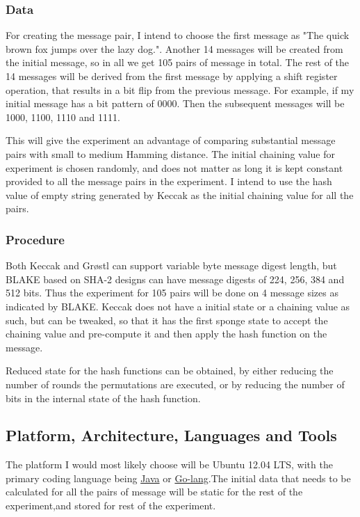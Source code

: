 \documentclass[12pt]{artikel3}                  %
\begin{document}
  \subsubsection{Data}
  
  For creating the message pair, I intend to choose the first message as "The quick brown fox jumps over the lazy dog.".
  Another 14 messages will be created from the initial message, so in all we get %
  105 pairs of message in total. The rest of the 14 messages will be derived from the first message by applying a
  shift register operation, that results in a bit flip from the previous message. For example, if my initial message has
  a bit pattern of 0000. Then the subsequent messages will be 1000, 1100, 1110 and 1111.
  
  This will give the experiment an advantage of comparing substantial message pairs with small to medium Hamming distance.
  The initial chaining value for experiment is chosen randomly, and does not matter as long it is kept constant provided
  to all the message pairs in the experiment. I intend to use the hash value of empty string generated by Keccak as the 
  initial chaining value for all the pairs.

  \subsubsection{Procedure}

  Both Keccak and Gr{\o}stl can support variable byte message digest length, but BLAKE based on SHA-2 designs can have
  message digests of 224, 256, 384 and 512 bits. Thus the experiment for 105 pairs will be done on 4 message sizes as
  indicated by BLAKE. Keccak does not have a initial state or a chaining value as such, but can be tweaked, so that it
  has the first sponge state to accept the chaining value and pre-compute it and then apply the hash function on the
  message.

  Reduced state for the hash functions can be obtained, by either reducing the number of rounds the permutations
  are executed, or by reducing the number of bits in the internal state of the hash function.

\subsection{Platform, Architecture, Languages and Tools}
The platform I would most likely choose will be Ubuntu 12.04 LTS, with the primary coding language
being \href{"https://en.wikipedia.org/wiki/Java\_(programming_language)"}{Java} or 
\href{"http://golang.org/"}{Go-lang}.The initial data that needs to be 
calculated for all the pairs of message will be static for the rest of the experiment,and stored for 
rest of the experiment.
\end{document}
